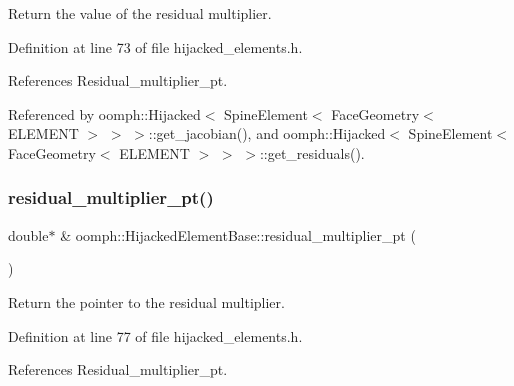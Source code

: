 Return the value of the residual multiplier. 



Definition at line 73 of file hijacked\+\_\+elements.\+h.



References Residual\+\_\+multiplier\+\_\+pt.



Referenced by oomph\+::\+Hijacked$<$ Spine\+Element$<$ Face\+Geometry$<$ E\+L\+E\+M\+E\+N\+T $>$ $>$ $>$\+::get\+\_\+jacobian(), and oomph\+::\+Hijacked$<$ Spine\+Element$<$ Face\+Geometry$<$ E\+L\+E\+M\+E\+N\+T $>$ $>$ $>$\+::get\+\_\+residuals().

\mbox{\label{classoomph_1_1HijackedElementBase_affdb1888fb6b2de051bc0345e6f5d934}} 
\subsubsection{\texorpdfstring{residual\+\_\+multiplier\+\_\+pt()}{residual\_multiplier\_pt()}}
{\footnotesize\ttfamily double$\ast$ \& oomph\+::\+Hijacked\+Element\+Base\+::residual\+\_\+multiplier\+\_\+pt (\begin{DoxyParamCaption}{ }\end{DoxyParamCaption})\hspace{0.3cm}{\ttfamily [inline]}}



Return the pointer to the residual multiplier. 



Definition at line 77 of file hijacked\+\_\+elements.\+h.



References Residual\+\_\+multiplier\+\_\+pt.

\mbox{\label{classoomph_1_1HijackedElementBase_a0a373a87d121205b9cc0fd54ea41f4ad}} 
